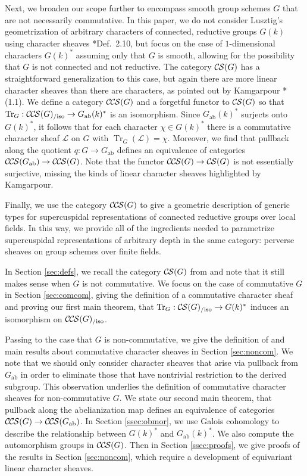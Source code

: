 \documentclass[10pt]{amsart}
\theoremstyle{plain}
\theoremstyle{definition}
\newcommand{\ab}{_{\operatorname{ab}}}
\newcommand{\TrFrob}[1]{\operatorname{Tr}_{#1}}
\newcommand{\cs}[1]{{\mathcal{#1}}}
\newcommand{\CS}{{\mathcal{C\hskip-0.8pt S}}}
\newcommand{\CCS}{{\mathcal{C\hskip-.8pt C\hskip-0.8pt S}}}
\newcommand{\CSiso}[1]{\CS(#1)_{/\text{iso}}}
\newcommand{\CCSiso}[1]{\CCS(#1)_{/\text{iso}}}
\begin{document}
Next, we broaden our scope further to encompass smooth group schemes $G$ that are not necessarily commutative.
In this paper, we do not consider Lusztig's geometrization of arbitrary characters of connected, reductive groups $G(k)$
using character sheaves \cite{lusztig:85a}*{Def.~2.10}, but focus on the case of $1$-dimensional characters
$G(k)^*$ assuming only that $G$ is smooth, allowing for the possibility that $G$ is not connected and not reductive.
The category $\CS(G)$ has a straightforward generalization to this case, but again
there are more linear character sheaves than there are characters, as pointed out by Kamgarpour \cite{kamgarpour:09a}*{(1.1)}.
We define a category $\CCS(G)$ and a forgetful functor to $\CS(G)$ so that $\TrFrob{G} : \CCSiso{G} \to G\ab(k)^*$
is an isomorphism.  
Since $G\ab(k)^*$ surjects onto $G(k)^*$, it follows that for each character $\chi \in G(k)^*$ there is a commutative
character sheaf $\cs{L}$ on $G$ with $\TrFrob{G}(\cs{L}) = \chi$. Moreover, we find that pullback along the quotient $q : G \to G\ab$
defines an equivalence of categories $\CCS(G\ab) \to \CCS(G)$.  Note that the functor $\CCS(G) \to \CS(G)$ is not
essentially surjective, missing the kinds of linear character sheaves highlighted by Kamgarpour.

Finally, we use the category $\CCS(G)$ to give a geometric description of generic types for supercuspidal representations
of connected reductive groups over local fields.  In this way, we provide all of the ingredients
needed to parametrize supercuspidal representations of arbitrary depth in the same category:
perverse sheaves on group schemes over finite fields. 

In Section \ref{sec:defs}, we recall the category $\CS(G)$ from \cite{cunningham-roe:13a} and note that it still makes
sense when $G$ is not commutative.  We focus on the case of commutative $G$ in Section \ref{sec:comcom},
giving the definition of a commutative character sheaf and proving our first main theorem, that
$\TrFrob{G} : \CSiso{G} \to G(k)^*$ induces an isomorphism on $\CCSiso{G}$.

Passing to the case that $G$ is
non-commutative, we give the definition of and main results about commutative character sheaves in
Section \ref{sec:noncom}.  We note that we should only consider character sheaves
that arise via pullback from $G\ab$ in order to eliminate those that have nontrivial restriction
to the derived subgroup.  This observation underlies the definition of commutative character sheaves for
non-commutative $G$.  We state our second main theorem, that pullback along the abelianization map
defines an equivalence of categories $\CCS(G) \to \CCS(G\ab)$.
In Section \ref{ssec:obmor}, we use Galois cohomology to describe the relationship between $G(k)^*$
and $G\ab(k)^*$.  We also compute the automorphism groups in $\CCS(G)$.
Then in Section \ref{ssec:proofs}, we give proofs of the results in Section \ref{sec:noncom}, which
require a development of equivariant linear character sheaves.
\end{document}
